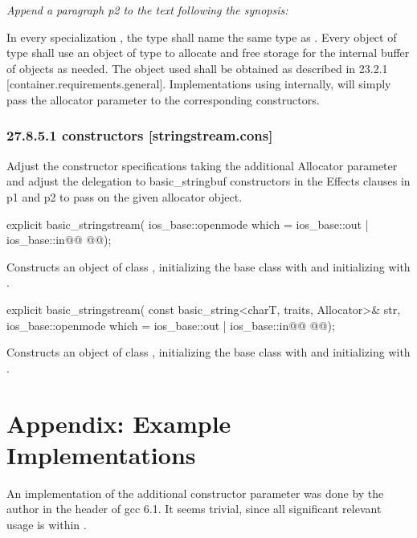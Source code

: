 \documentclass[ebook,11pt,article]{memoir}
\begin{document}
\textit{Append a paragraph p2 to the text following the synopsis:}

\begin{insrt}
\pnum
In every specialization , the type  shall name the same type as . Every object of type  shall use an object of type  to allocate and free storage for the internal buffer of  objects as needed. The  object used shall be obtained as described in 23.2.1 [container.requirements.general].
\enternote
Implementations using  internally, will simply pass the allocator parameter to the corresponding  constructors.
\exitnote
\end{insrt}

\subsection{27.8.5.1  constructors [stringstream.cons]}
Adjust the constructor specifications taking the additional Allocator parameter and adjust the delegation to basic_stringbuf constructors in the Effects clauses in p1 and p2 to pass on the given allocator object.
\begin{itemdecl}
explicit basic_stringstream(
  ios_base::openmode which = ios_base::out | ios_base::in@\ins{,}@
  @@);
\end{itemdecl}

\begin{itemdescr}
\pnum
\effects
Constructs an object of class
,
initializing the base class with
and initializing
with
.
\end{itemdescr}

%
\begin{itemdecl}
explicit basic_stringstream(
  const basic_string<charT, traits, Allocator>& str,
  ios_base::openmode which = ios_base::out | ios_base::in@\ins{,}@
  @@);
\end{itemdecl}

\begin{itemdescr}
\pnum
\effects
Constructs an object of class
,
initializing the base class with
and initializing
with
.
\end{itemdescr}



\chapter{Appendix: Example Implementations}
An implementation of the additional constructor parameter was done by the author in the  header of gcc 6.1. It seems trivial, since all significant relevant usage is within . 
\end{document}
